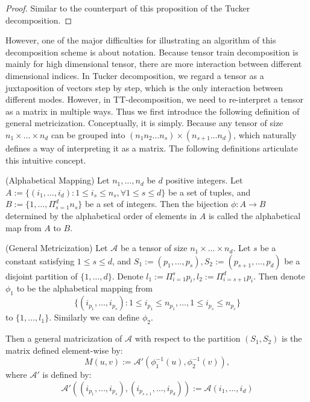 \documentclass[12pt]{article}
\begin{document}
\begin{proof}
Similar to the counterpart of this proposition of the Tucker decomposition.
\end{proof}

However, one of the major difficulties for illustrating an algorithm of this decomposition scheme is about notation. Because tensor train decomposition is mainly for high dimensional tensor, there are more interaction between different dimensional indices. In Tucker decomposition, we regard a tensor as a juxtaposition of vectors step by step, which is the only interaction between different modes. However, in TT-decomposition, we need to re-interpret a tensor as a matrix in multiple ways. Thus we first introduce the following definition of general metricization. Conceptually, it is simply. Because any tensor of size $n_1 \times \dots \times n_d$ can be grouped into $ (n_1 n_2 \dots n_s) \times (n_{s+1} \dots n_d)$, which naturally defines a way of interpreting it as a matrix. The following definitions articulate this intuitive concept.


\begin{mydef}{(Alphabetical Mapping)}
Let $n_1, \dots, n_d$ be $d$ positive integers. Let $A := \{( i_1, \dots, i_d ) : 1 \leq i_s \leq n_s, \forall 1 \leq s \leq d \}$ be a set of tuples, and $B := \{1, \dots, \Pi_{s=1}^dn_s\}$ be a set of integers. Then the bijection  $\phi : A \rightarrow B$ determined by the alphabetical order of elements in $A$ is called the alphabetical map from $A$ to $B$.
\end{mydef}

\begin{mydef}{(General Metricization)}
Let $\mathcal{A}$ be a tensor of size $n_1 \times \dots \times n_d$. Let $s$ be a constant satisfying $1 \leq s \leq d$, and $S_1 := (p_1, \dots, p_s), S_2 := (p_{s+1}, \dots, p_d)$
be a disjoint partition of $\{1, \dots, d\}$. Denote $l_1 := \Pi_{i = 1}^s p_i, l_2 := \Pi_{i = s+1}^d p_i$. Then denote $\phi_1$ to be the alphabetical mapping from 
$$\{(i_{p_1}, \dots, i_{p_s}): 1 \leq i_{p_1} \leq n_{p_1}, \dots, 1 \leq i_{p_s} \leq n_{p_s} \}$$
to $\{1, \dots, l_1\}$. Similarly we can define $\phi_2$.

Then a general matricization of $\mathcal{A}$ with respect to the partition $(S_1, S_2)$ is the matrix defined element-wise by:
$$ M(u, v) := \mathcal{A}' ( \phi_1^{-1}(u), \phi_2^{-1}(v) ), $$
where $\mathcal{A}'$ is defined by:
$$ \mathcal{A}'( (i_{p_1}, \dots, i_{p_s}), (i_{p_{s+1}}, \dots, i_{p_d})) := \mathcal{A}(i_1, \dots, i_d)$$
\end{mydef}
\end{document}
